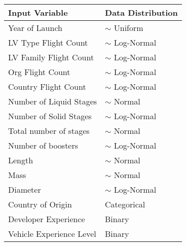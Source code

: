 \documentclass[letterpaper,conference]{IEEEtran}
\begin{document}
\begin{table}[!h]
\begin{center}
\caption{\color{Purple0}{(a table idea) Feature Summary}}
\label{tab2}
\begin{tabular}{ l  l }
\hline

Input Variable                        & Data Distribution\\

\hline

Year of Launch                       & $\sim$ Uniform \\
LV Type Flight Count               & $\sim$ Log-Normal \\
LV Family Flight Count             & $\sim$ Log-Normal \\
Org Flight Count                     & $\sim$ Log-Normal \\
Country Flight Count               & $\sim$ Log-Normal \\
Number of Liquid Stages          & $\sim$ Normal \\
Number of Solid Stages           & $\sim$ Log-Normal \\
Total number of stages            & $\sim$ Normal \\
Number of boosters                & $\sim$ Log-Normal \\
Length                                 & $\sim$ Normal \\
Mass                                    & $\sim$ Normal \\
Diameter                              & $\sim$ Log-Normal \\
Country of Origin                   & Categorical \\
Developer Experience             & Binary \\
Vehicle Experience Level         & Binary \\
\hline 
\end{tabular}
\end{center}
\end{table}
\end{document}
